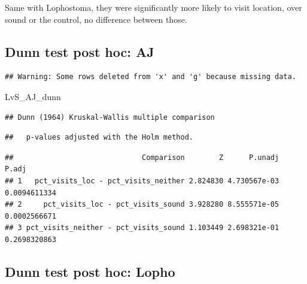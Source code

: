 \documentclass[]{article}
\newenvironment{Shaded}{\begin{snugshade}}{\end{snugshade}}
\newcommand{\KeywordTok}[1]{\textcolor[rgb]{0.13,0.29,0.53}{\textbf{{#1}}}}
\newcommand{\DataTypeTok}[1]{\textcolor[rgb]{0.13,0.29,0.53}{{#1}}}
\newcommand{\StringTok}[1]{\textcolor[rgb]{0.31,0.60,0.02}{{#1}}}
\newcommand{\OtherTok}[1]{\textcolor[rgb]{0.56,0.35,0.01}{{#1}}}
\newcommand{\NormalTok}[1]{{#1}}
\begin{document}
Same with Lophostoma, they were significantly more likely to visit
location, over sound or the control, no difference between those.

\subsection{Dunn test post hoc: AJ}\label{dunn-test-post-hoc-aj}

\begin{Shaded}
\end{Shaded}

\begin{verbatim}
## Warning: Some rows deleted from 'x' and 'g' because missing data.
\end{verbatim}

\begin{Shaded}
\begin{Highlighting}[]
\NormalTok{LvS_AJ_dunn}
\end{Highlighting}
\end{Shaded}

\begin{verbatim}
## Dunn (1964) Kruskal-Wallis multiple comparison
\end{verbatim}

\begin{verbatim}
##   p-values adjusted with the Holm method.
\end{verbatim}

\begin{verbatim}
##                              Comparison        Z      P.unadj        P.adj
## 1   pct_visits_loc - pct_visits_neither 2.824830 4.730567e-03 0.0094611334
## 2     pct_visits_loc - pct_visits_sound 3.928280 8.555571e-05 0.0002566671
## 3 pct_visits_neither - pct_visits_sound 1.103449 2.698321e-01 0.2698320863
\end{verbatim}

\subsection{Dunn test post hoc: Lopho}\label{dunn-test-post-hoc-lopho}
\end{document}
